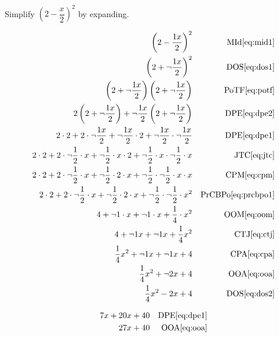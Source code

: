 \begin{example}[id:20141105-161225]\label{20141105-161225}  \hfill \\

Simplify $\left(2-\dfrac{x}{2} \right)^2$ by expanding.

\soln

\solnsteps
\begin{align*}
\left(2-\dfrac{1x}{2} \right)^2 && \text{MId} \eqref{eq:mid1} \\
\left(2+ \neg \dfrac{1x}{2} \right)^2 && \text{DOS} \eqref{eq:dos1} \\
\left(2+ \neg \dfrac{1x}{2} \right)\left(2+ \neg \dfrac{1x}{2} \right) && \text{PoTF} \eqref{eq:potf} \\
2\left(2+ \neg \dfrac{1x}{2} \right) + \neg \dfrac{1x}{2}\left(2+ \neg \dfrac{1x}{2} \right) && \text{DPE} \eqref{eq:dpe2} \\
2 \cdot 2 + 2 \cdot \neg \dfrac{1x}{2} + \neg \dfrac{1x}{2} \cdot 2 + \neg \dfrac{1x}{2} \cdot \neg \dfrac{1x}{2} && \text{DPE} \eqref{eq:dpe1} \\
2 \cdot 2 + 2 \cdot \neg \dfrac{1}{2} \cdot x + \neg \dfrac{1}{2} \cdot x \cdot 2 + \neg \dfrac{1}{2} \cdot x \cdot \neg \dfrac{1}{2} \cdot x && \text{JTC} \eqref{eq:jtc} \\
2 \cdot 2 + 2 \cdot \neg \dfrac{1}{2} \cdot x + \neg \dfrac{1}{2} \cdot 2 \cdot x + \neg \dfrac{1}{2} \cdot \neg \dfrac{1}{2} \cdot x \cdot x && \text{CPM} \eqref{eq:cpm} \\
2 \cdot 2 + 2 \cdot \neg \dfrac{1}{2} \cdot x + \neg \dfrac{1}{2} \cdot 2 \cdot x + \neg \dfrac{1}{2} \cdot \neg \dfrac{1}{2} \cdot x^2 && \text{PrCBPo} \eqref{eq:prcbpo1} \\
4 + \neg 1 \cdot x + \neg 1 \cdot x +  \dfrac{1}{4} \cdot x^2 && \text{OOM} \eqref{eq:oom} \\
4 + \neg 1 x + \neg 1 x +  \dfrac{1}{4} x^2 && \text{CTJ} \eqref{eq:ctj} \\
\dfrac{1}{4} x^2 + \neg 1 x + \neg 1 x + 4 && \text{CPA} \eqref{eq:cpa} \\
\dfrac{1}{4} x^2 + \neg 2 x + 4 && \text{OOA} \eqref{eq:ooa} \\
\dfrac{1}{4} x^2 - 2 x + 4 && \text{DOS} \eqref{eq:dos2} 
\end{align*}

\soln

\lesssteps
\begin{align*}
7x + 20x + 40 && \text{DPE} \eqref{eq:dpe1} \\ 
27x + 40 && \text{OOA} \eqref{eq:ooa} 
\end{align*}
\end{example}



